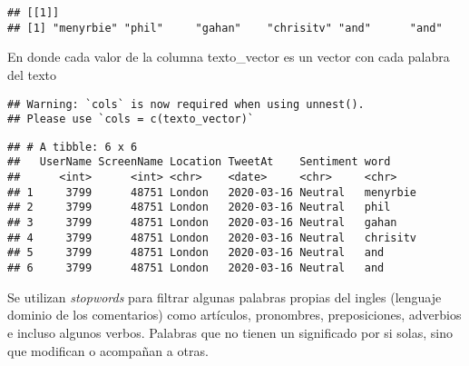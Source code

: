 \documentclass[
]{article}
\newenvironment{Shaded}{\begin{snugshade}}{\end{snugshade}}
\newcommand{\CommentTok}[1]{\textcolor[rgb]{0.56,0.35,0.01}{\textit{#1}}}
\newcommand{\DataTypeTok}[1]{\textcolor[rgb]{0.13,0.29,0.53}{#1}}
\newcommand{\KeywordTok}[1]{\textcolor[rgb]{0.13,0.29,0.53}{\textbf{#1}}}
\newcommand{\NormalTok}[1]{#1}
\newcommand{\OperatorTok}[1]{\textcolor[rgb]{0.81,0.36,0.00}{\textbf{#1}}}
\newcommand{\StringTok}[1]{\textcolor[rgb]{0.31,0.60,0.02}{#1}}
\begin{document}
\begin{verbatim}
## [[1]]
## [1] "menyrbie" "phil"     "gahan"    "chrisitv" "and"      "and"
\end{verbatim}

En donde cada valor de la columna texto\_vector es un vector con cada
palabra del texto

\begin{Shaded}
\end{Shaded}

\begin{verbatim}
## Warning: `cols` is now required when using unnest().
## Please use `cols = c(texto_vector)`
\end{verbatim}

\begin{Shaded}
\end{Shaded}

\begin{verbatim}
## # A tibble: 6 x 6
##   UserName ScreenName Location TweetAt    Sentiment word    
##      <int>      <int> <chr>    <date>     <chr>     <chr>   
## 1     3799      48751 London   2020-03-16 Neutral   menyrbie
## 2     3799      48751 London   2020-03-16 Neutral   phil    
## 3     3799      48751 London   2020-03-16 Neutral   gahan   
## 4     3799      48751 London   2020-03-16 Neutral   chrisitv
## 5     3799      48751 London   2020-03-16 Neutral   and     
## 6     3799      48751 London   2020-03-16 Neutral   and
\end{verbatim}

Se utilizan \emph{stopwords} para filtrar algunas palabras propias del
ingles (lenguaje dominio de los comentarios) como artículos, pronombres,
preposiciones, adverbios e incluso algunos verbos. Palabras que no
tienen un significado por si solas, sino que modifican o acompañan a
otras.
\end{document}
